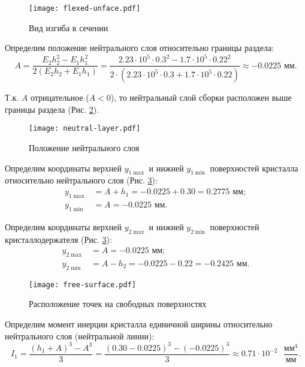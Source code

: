 \begin{figure}[h]
    \centering
    \texttt{[image: flexed-unface.pdf]}
    \caption{Вид изгиба в сечении}
    \label{fig:flexed-unface}
\end{figure}

Определим положение нейтрального слоя относительно границы раздела:
\[
    A = \frac{E_2 h_2^2 - E_1 h_1^2}{2 \left(E_2 h_2 + E_1 h_1\right)}
      = \frac{2.23 \cdot 10^5 \cdot 0.3^2 - 1.7 \cdot 10^5 \cdot 0.22^2}{2 \cdot (2.23 \cdot 10^5 \cdot 0.3 + 1.7 \cdot 10^5 \cdot 0.22)}
      \approx -0.0225 \text{ мм}.
\]

Т.к. $A$ отрицательное ($A < 0$), то нейтральный слой сборки расположен выше границы раздела (Рис. \ref{fig:neutral-layer}).

\begin{figure}[h]
    \centering
    \texttt{[image: neutral-layer.pdf]}
    \caption{Положение нейтрального слоя}
    \label{fig:neutral-layer}
\end{figure}

Определим координаты верхней $y_{1\max}$ и нижней $y_{1\min}$ поверхностей кристалла относительно нейтрального слоя (Рис. \ref{fig:free-surface}):
\begin{equation}
    \begin{aligned}
        y_{1\max} & = A + h_1 = -0.0225 + 0.30 = 0.2775 \text{ мм}; \\
        y_{1\min} & = A = -0.0225 \text{ мм}.
    \end{aligned}
\end{equation}

Определим координаты верхней $y_{2\max}$ и нижней $y_{2\min}$ поверхностей кристаллодержателя (Рис. \ref{fig:free-surface}):
\begin{equation}
    \begin{aligned}
        y_{2\max} & = A = -0.0225 \text{ мм}; \\
        y_{2\min} & = A - h_2 = -0.0225 - 0.22 = -0.2425 \text{ мм}.
    \end{aligned}
\end{equation}

\begin{figure}[h]
    \centering
    \texttt{[image: free-surface.pdf]}
    \caption{Расположение точек на свободных поверхностях}
    \label{fig:free-surface}
\end{figure}

Определим момент инерции кристалла единичной ширины относительно нейтрального слоя (нейтральной линии):
\[
    I_1 = \frac{(h_1 + A)^3 - A^3}{3}
        = \frac{(0.30 - 0.0225)^3 - (-0.0225)^3}{3}
        \approx 0.71 \cdot 10^{-2} \text{ } \frac{мм^4}{мм}.
\]

